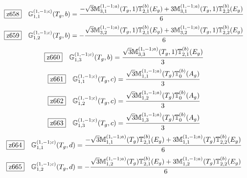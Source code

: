 \documentclass[fleqn,10pt,landscape]{jsarticle}
\begin{document}
\begin{dmath*}
\hspace*{3mm}\fbox{z658}\quad \mathbb{G}_{1,1}^{(1,-1;c)}(T_{g},b)=\frac{- \sqrt{3} \mathbb{M}_{3,1}^{(1,-1;a)}(T_{g},1) \mathbb{T}_{2,1}^{(b)}(E_{g}) + 3 \mathbb{M}_{3,1}^{(1,-1;a)}(T_{g},1) \mathbb{T}_{2,2}^{(b)}(E_{g})}{6}
\end{dmath*}
\begin{dmath*}
\hspace*{3mm}\fbox{z659}\quad \mathbb{G}_{1,2}^{(1,-1;c)}(T_{g},b)=- \frac{\sqrt{3} \mathbb{M}_{3,2}^{(1,-1;a)}(T_{g},1) \mathbb{T}_{2,1}^{(b)}(E_{g}) + 3 \mathbb{M}_{3,2}^{(1,-1;a)}(T_{g},1) \mathbb{T}_{2,2}^{(b)}(E_{g})}{6}
\end{dmath*}
\begin{dmath*}
\hspace*{3mm}\fbox{z660}\quad \mathbb{G}_{1,3}^{(1,-1;c)}(T_{g},b)=\frac{\sqrt{3} \mathbb{M}_{3,3}^{(1,-1;a)}(T_{g},1) \mathbb{T}_{2,1}^{(b)}(E_{g})}{3}
\end{dmath*}
\begin{dmath*}
\hspace*{3mm}\fbox{z661}\quad \mathbb{G}_{1,1}^{(1,-1;c)}(T_{g},c)=\frac{\sqrt{3} \mathbb{M}_{1,1}^{(1,-1;a)}(T_{g}) \mathbb{T}_{0}^{(b)}(A_{g})}{3}
\end{dmath*}
\begin{dmath*}
\hspace*{3mm}\fbox{z662}\quad \mathbb{G}_{1,2}^{(1,-1;c)}(T_{g},c)=\frac{\sqrt{3} \mathbb{M}_{1,2}^{(1,-1;a)}(T_{g}) \mathbb{T}_{0}^{(b)}(A_{g})}{3}
\end{dmath*}
\begin{dmath*}
\hspace*{3mm}\fbox{z663}\quad \mathbb{G}_{1,3}^{(1,-1;c)}(T_{g},c)=\frac{\sqrt{3} \mathbb{M}_{1,3}^{(1,-1;a)}(T_{g}) \mathbb{T}_{0}^{(b)}(A_{g})}{3}
\end{dmath*}
\begin{dmath*}
\hspace*{3mm}\fbox{z664}\quad \mathbb{G}_{1,1}^{(1,-1;c)}(T_{g},d)=\frac{- \sqrt{3} \mathbb{M}_{1,1}^{(1,-1;a)}(T_{g}) \mathbb{T}_{2,1}^{(b)}(E_{g}) + 3 \mathbb{M}_{1,1}^{(1,-1;a)}(T_{g}) \mathbb{T}_{2,2}^{(b)}(E_{g})}{6}
\end{dmath*}
\begin{dmath*}
\hspace*{3mm}\fbox{z665}\quad \mathbb{G}_{1,2}^{(1,-1;c)}(T_{g},d)=- \frac{\sqrt{3} \mathbb{M}_{1,2}^{(1,-1;a)}(T_{g}) \mathbb{T}_{2,1}^{(b)}(E_{g}) + 3 \mathbb{M}_{1,2}^{(1,-1;a)}(T_{g}) \mathbb{T}_{2,2}^{(b)}(E_{g})}{6}
\end{dmath*}
\end{document}
